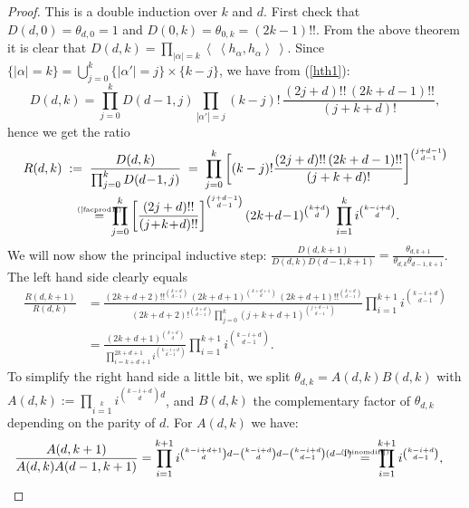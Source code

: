 \documentclass{amsart}
\newcommand{\coloneqq}{:=}
\newcommand{\bra}{\left<\!\!\!\:\left<}
\newcommand{\ket}{\right>\!\!\!\:\right>}
\newcommand{\myeq}[1]{\mathrel{\overset{\makebox[0pt]{\text{\tiny #1}}}{=}}}
\theoremstyle{plain}
\theoremstyle{definition}
\theoremstyle{remark}
\begin{document}
\begin{proof} This is a double induction over $k$ and $d$. First check that $D(d,0) = \theta_{d,0}=1$ and $D(0,k) = \theta_{0,k} =(2k-1)!!$.
From the above theorem it is clear that $D(d,k)=\prod_{|\alpha | =k}\bra h_\alpha ,h_\alpha \ket$. Since $\{ |\alpha| = k \} = \bigcup_{j=0}^k  \{ |\alpha'| = j \} \times \{ k-j \}  $, we have from (\ref{hth1}):
$$
D(d,k) = \prod_{j=0}^k D(d\!-\!1,j) \prod_{|\alpha'| = j} (k-j)!\,\frac{(2j+d)!!\,(2k+d-1)!!}{(j+k+d)!},
$$
hence we get the ratio \vspace{-1mm}
\begin{align*}
R(d,k) \;&\coloneqq\; \frac{D(d,k)}{\prod_{j=0}^k D(d\!-\!1,j) } \;=\; \prod_{j=0}^k \left[(k-j)!\frac{(2j+d)!!\,(2k+d-1)!!}{(j+k+d)!} \right]^{\binom{j+d-1}{d-1}} \\
&\qquad\myeq{(\ref{facprod1})}\; \prod_{j=0}^k\left[ \frac{(2j+d)!!}{(j\!+\!k\!+\!d)!!}\right]^{\binom{j+d-1}{d-1}}(2k\!+\!d\!-\!1)^{\binom{k+d}{d}} \;\prod_{i=1}^k i^{\binom{k-i+d}{d}} .
\end{align*}
We will now show the principal inductive step: $\frac{D(d,k+1)}{D(d,k)D(d-1,k+1)}=\frac{\theta_{d,k+1}}{\theta_{d,k}\theta_{d-1,k+1}}$. The left hand side clearly equals
\begin{align*}
 \frac{R(d,k+1)}{R(d,k)} &= \frac{(2k\!+\!d\!+\!2)!!^{\binom{k+d}{d-1}}\,(2k\!+\!d\!+\!1)^{\binom{k+d+1}{d}}\,(2k\!+\!d\!+\!1)!!^{\binom{k+d}{d-1}}}{(2k\!+\!d\!+\!2)!^{\binom{k+d}{d-1}} \prod\limits_{j=0}^k(j\!+\!k\!+\!d\!+\!1)^{\binom{j+d-1}{d-1}}} \prod_{i=1}^{k+1} i^{\binom{k-i+d}{d-1}}\\
&= \frac{(2k+d+1)^{\binom{k+d}{d}}}{\prod\limits_{i=k+d+1}^{2k+d+1}i^{ \binom{k-i+d}{d-1}} }\prod_{i=1}^{k+1} i^{\binom{k-i+d}{d-1}}.
\end{align*}
To simplify the right hand side a little bit, we split $\theta_{d,k} = A(d,k)B(d,k)$ with $A(d,k)\coloneqq\prod_{i=1}\limits^k i^{\binom{k-i+d}{d}d}$, and $B(d,k)$ the complementary factor of $\theta_{d,k}$ depending on the parity of $d$. For $A(d,k)$ we have:
\begin{align*}
\frac{A(d,k+1)}{A(d,k)A(d-1,k+1)} &=
 \prod_{i=1}^{k+1}i^{\binom{k-i+d+1}{d}d-\binom{k-i+d}{d}d -\binom{k-i+d}{d-1}(d-1)} \ 
 \myeq{(\ref{binomdiff})}\ \prod_{i=1}^{k+1} i^{\binom{k-i+d}{d-1}},
\end{align*}

\end{proof}
\end{document}
